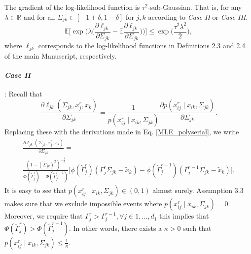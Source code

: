 \begin{condition}\label{Gradient statistical noise}
    The gradient of the log-likelihood function is $\tau^2$-sub-Gaussian. That is, for any $\lambda \in \mathbb{R}$ and for all $\Sigma_{jk} \in [-1+\delta, 1-\delta]$ for $j,k$ according to \textit{Case II} or \textit{Case III}.
    \begin{equation}
        \mathbb{E}\Bigg[\exp\Bigg(\lambda \Big(\frac{\partial\ell_{jk}}{\partial \Sigma_{jk}} - \mathbb{E}\frac{\partial\ell_{jk}}{\partial \Sigma_{jk}} \Big) \Bigg)\Bigg] \leq \exp\Big(\frac{\tau^2\lambda^2}{2}\Big),
    \end{equation}
    where $\ell_{jk}$ corresponds to the log-likelihood functions in Definitions 2.3 and 2.4 of the main Manuscript, respectively.
    \paragraph{\textit{Case II}}: Recall that
    \begin{equation*}
        \frac{\partial\ell_{jk}(\Sigma_{jk}, x_j^r,x_k)}{\partial \Sigma_{jk}} = \frac{1}{p(x_{ij}^{r} \mid x_{ik}, \Sigma_{jk})} \frac{\partial p(x_{ij}^{r} \mid x_{ik}, \Sigma_{jk})}{\partial \Sigma_{jk}}.
    \end{equation*}
    Replacing these with the derivations made in Eq. \eqref{MLE_polyserial}, we write
    \begin{multline*}
        \frac{\partial\ell_{jk}(\Sigma_{jk}, x_j^r,x_k)}{\partial \Sigma_{jk}} = \\
        \frac{(1-(\Sigma_{jk})^2)^{-\frac{3}{2}}}{\Phi({\tilde{\Gamma}}_j^{r}) - \Phi({\tilde{\Gamma}}_j^{r-1})} \Bigg[\phi({\tilde{\Gamma}}_j^{r})({\Gamma}_j^r\Sigma_{jk} - {\tilde{x}}_{k}) - \phi({\tilde{\Gamma}}_j^{r-1})({\Gamma}_j^{r-1}\Sigma_{jk} - {\tilde{x}}_{k})\Bigg].
    \end{multline*}
    It is easy to see that $p(x_{ij}^{r} \mid x_{ik}, \Sigma_{jk}) \in (0,1)$ almost surely. Assumption 3.3
    makes sure that we exclude impossible events where $p(x_{ij}^{r} \mid x_{ik}, \Sigma_{jk}) = 0$. Moreover, we require that $\Gamma_j^r > \Gamma_j^{r-1}, \forall j \in 1, \dots, d_1$ this implies that $\Phi({\tilde{\Gamma}}_j^{r}) > \Phi({\tilde{\Gamma}}_j^{r-1})$. In other words, there exists a $\kappa >0$ such that $p(x_{ij}^{r} \mid x_{ik}, \Sigma_{jk}) \leq \frac{1}{\kappa}$.


\end{condition}
